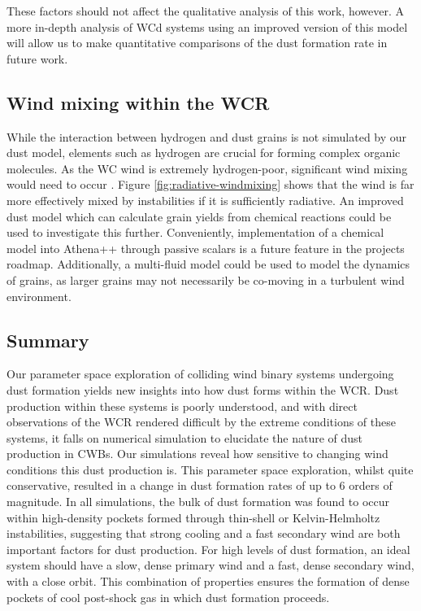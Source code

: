 \documentclass[fleqn,usenatbib]{mnras}
\begin{document}
\noindent
These factors should not affect the qualitative analysis of this work, however.
A more in-depth analysis of WCd systems using an improved version of this model will allow us to make quantitative comparisons of the dust formation rate in future work.

\subsection{Wind mixing within the WCR}

While the interaction between hydrogen and dust grains is not simulated by our dust model, elements such as hydrogen are crucial for forming complex organic molecules.
As the WC wind is extremely hydrogen-poor, significant wind mixing would need to occur
\citep{herbstComplexOrganicInterstellar2009}.
Figure \ref{fig:radiative-windmixing} shows that the wind is far more effectively mixed by instabilities if it is sufficiently radiative.
An improved dust model which can calculate grain yields from chemical reactions could be used to investigate this further.
Conveniently, implementation of a chemical model into Athena++ through passive scalars is a future feature in the projects roadmap.
Additionally, a multi-fluid model could be used to model the dynamics of grains, as larger grains may not necessarily be co-moving in a turbulent wind environment.

\subsection{Summary}

Our parameter space exploration of colliding wind binary systems undergoing dust formation yields new insights into how dust forms within the WCR.
Dust production within these systems is poorly understood, and with direct observations of the WCR rendered difficult by the extreme conditions of these systems, it falls on numerical simulation to elucidate the nature of dust production in CWBs.
Our simulations reveal how sensitive to changing wind conditions this dust production is.
This parameter space exploration, whilst quite conservative, resulted in a change in dust formation rates of up to 6 orders of magnitude.
In all simulations, the bulk of dust formation was found to occur within high-density pockets formed through thin-shell or Kelvin-Helmholtz instabilities, suggesting that strong cooling and a fast secondary wind are both important factors for dust production.
For high levels of dust formation, an ideal system should have a slow, dense primary wind and a fast, dense secondary wind, with a close orbit.
This combination of properties ensures the formation of dense pockets of cool post-shock gas in which dust formation proceeds.
\end{document}
